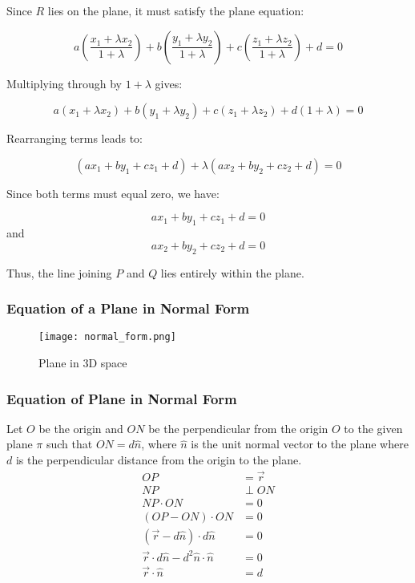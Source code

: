 \begin{frame}
   Since \(R\) lies on the plane, it must satisfy the plane equation:

   \[
   a\left(\frac{x_{1} + \lambda x_{2}}{1+\lambda}\right) + b\left(\frac{y_{1} + \lambda y_{2}}{1+\lambda}\right) + c\left(\frac{z_{1} + \lambda z_{2}}{1+\lambda}\right) + d = 0
   \]

   Multiplying through by \(1+\lambda\) gives:

   \[
   a(x_{1} + \lambda x_{2}) + b(y_{1} + \lambda y_{2}) + c(z_{1} + \lambda z_{2}) + d(1+\lambda) = 0
   \]
\end{frame} 

\begin{frame}
   Rearranging terms leads to:

   \[
   (ax_{1} + by_{1} + cz_{1} + d) + \lambda (ax_{2} + by_{2} + cz_{2} + d) = 0
   \]

   Since both terms must equal zero, we have:

   \[
   ax_{1} + by_{1} + cz_{1} + d = 0
   \]
   and
   \[
   ax_{2} + by_{2} + cz_{2} + d = 0
   \]

   Thus, the line joining \(P\) and \(Q\) lies entirely within the plane.

\end{frame}

\begin{frame}
    \frametitle{Equation of a Plane in Normal Form}
    \begin{figure}
        \texttt{[image: normal\_form.png]}
        \caption{Plane in 3D space}
    \end{figure}
\end{frame}

\begin{frame}
\frametitle{Equation of Plane in Normal Form}
    Let \(O\) be the origin and \(ON\) be the perpendicular from the origin \(O\) to the given plane \(\pi\) such that \(ON = d \hat{n}\), where \(\hat{n}\) is the unit normal vector to the plane where \( d\) is the perpendicular distance from the origin to the plane. 
    \begin{align*} 
        OP &= \vec{r} \\ 
        NP &\perp ON \\ 
        NP \cdot ON &= 0 \\ 
        (OP - ON) \cdot ON &= 0 \\
        ( \vec{r} - d \hat{n}) \cdot d\hat{n} &= 0 \\
        \vec{r} \cdot d \hat{n} - d^2 \hat{n} \cdot \hat{n} &= 0 \\
        \vec{r} \cdot \hat{n} &= d
    \end{align*}
\end{frame}

